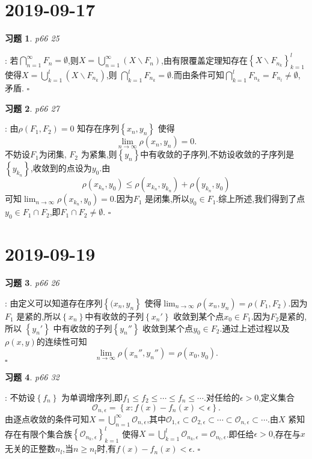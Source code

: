\documentclass[a4paper]{article}
\renewcommand\O{\ensuremath{\emptyset}}
\newtheorem*{exe}{习题}
\newenvironment{sol}{{\noindent\bfseries 解}:}{\hfill $\square$\par}
\begin{document}
\section{2019-09-17}
\begin{exe}
  p66 25
\end{exe}
\begin{sol}
  若$\bigcap_{n=1} ^{\infty}F_n=\emptyset$,则$X=\bigcup_{n=1} ^{\infty}\left( X\backslash F_n \right) $,由有限覆盖定理知存在$\left\{ X\backslash F_{n_k} \right\}_{k=1}^{l} $ 使得$X=\bigcup_{k=1} ^{l}\left( X\backslash F_{n_k} \right) $,则 $\bigcap_{k=1} ^{l}F_{n_k}=\O$.而由条件可知$\bigcap_{k=1} ^{l}F_{n_k}=F_{n_l}\neq \O$,矛盾.
\end{sol}
\begin{exe}
  p66 27	
\end{exe}
\begin{sol}
  由$\rho(F_1,F_2)=0$ 知存在序列$\left\{ x_n,y_n \right\} $ 使得
   \[
     \lim_{n \to \infty} \rho(x_n,y_n)=0
  .\] 
  不妨设$F_1$为闭集, $F_2$ 为紧集,则$\left\{ y_n \right\} $中有收敛的子序列,不妨设收敛的子序列是$\left\{ y_{k_n} \right\} $,收敛到的点设为$y_0$.由
  \[
    \rho(x_{k_n},y_0)\le \rho(x_{k_n},y_{k_n})+\rho(y_{k_n},y_0)
  \]
  可知$\lim_{n \to \infty}\rho(x_{k_n},y_0)=0 $.因为$F_1$ 是闭集,所以$y_0\in F_1$.综上所述,我们得到了点$y_0\in F_1\cap F_2$,即$F_1\cap F_2\neq \O$.
\end{sol}
\section{2019-09-19}
\begin{exe}
  p66 26
\end{exe}
\begin{sol}
  由定义可以知道存在序列$\left\{ (x_n,y_n \right\} $ 使得$\lim_{n \to \infty} \rho(x_n,y_n)=\rho(F_1,F_2)$.因为$F_1$ 是紧的,所以$\left\{ x_n \right\} $中有收敛的子列$\left\{ x_{n}' \right\} $ 收敛到某个点$x_0\in F_1$.因为$F_2$是紧的,所以 $\left\{ y_n' \right\} $ 中有收敛的子列$\left\{ y_n'' \right\} $ 收敛到某个点$y_0\in F_2$.通过上述过程以及$\rho(x,y)$的连续性可知
   \[
     \lim_{n \to \infty} \rho(x_{n}'',y_n'')=\rho(x_0,y_0)
  .\] 
\end{sol}
\begin{exe}
  p66 32
\end{exe}
\begin{sol}
  不妨设$\left\{ f_n \right\} $ 为单调增序列,即$f_1\le f_2\le \cdots\le  f_n\le \cdots $.对任给的$\epsilon >0$,定义集合
   \[
     \mathcal{O}_{n,\epsilon }=\left\{ x:f(x)-f_n(x)<\epsilon  \right\} 
  .\] 
  由逐点收敛的条件可知$X=\bigcup_{n=1} ^{\infty}\mathcal{O}_{n,\epsilon }$,其中$\mathcal{O}_{1,\epsilon }\subset \mathcal{O}_{2,\epsilon }\subset \cdots\subset \mathcal{O}_{n,\epsilon }\subset \cdots$.由$X$ 紧知存在有限个集合族$\left\{ \mathcal{O}_{n_k,\epsilon } \right\}_{k=1}^{l} $ 使得$X=\bigcup_{k=1} ^{l}\mathcal{O}_{n_k,\epsilon }=\mathcal{O}_{n_l,\epsilon }$.即任给$\epsilon >0$,存在与$x$无关的正整数$n_l$,当$n\ge n_l$时,有$f(x)-f_n(x)<\epsilon $.
\end{sol}
\end{document}
